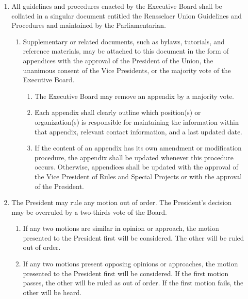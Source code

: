 \begin{enumerate}
\begin{enumerate}
\begin{enumerate}
    \end{enumerate}
  \item After the window of deference to the Student Senate has elapsed and after the confirmation of the Student Senate if deemed necessary, the President or the Vice President for Club Relations shall announce the changes to club officers and ensure the updated documents are made publicly available for members of the Union.
  \end{enumerate}
\item All guidelines and procedures enacted by the Executive Board shall be collated in a singular document entitled the Rensselaer Union Guidelines and Procedures and maintained by the Parliamentarian.
  \begin{enumerate}
  \item Supplementary or related documents, such as bylaws, tutorials, and reference materials, may be attached to this document in the form of appendices with the approval of the President of the Union, the unanimous consent of the Vice Presidents, or the majority vote of the Executive Board.
    \begin{enumerate}
    \item The Executive Board may remove an appendix by a majority vote.
    \item Each appendix shall clearly outline which position(s) or organization(s) is responsible for maintaining the information within that appendix, relevant contact information, and a last updated date.
    \item If the content of an appendix has its own amendment or modification procedure, the appendix shall be updated whenever this procedure occurs. Otherwise, appendices shall be updated with the approval of the Vice President of Rules and Special Projects or with the approval of the President.
    \end{enumerate}
  \end{enumerate}
\item The President may rule any motion out of order. The President’s decision may be overruled by a two-thirds vote of the Board.
  \begin{enumerate}
  \item If any two motions are similar in opinion or approach, the motion presented to the President first will be considered. The other will be ruled out of order.
  \item If any two motions present opposing opinions or approaches, the motion presented to the President first will be considered. If the first motion passes, the other will be ruled as out of order. If the first motion fails, the other will be heard.
  \end{enumerate}
\end{enumerate}

